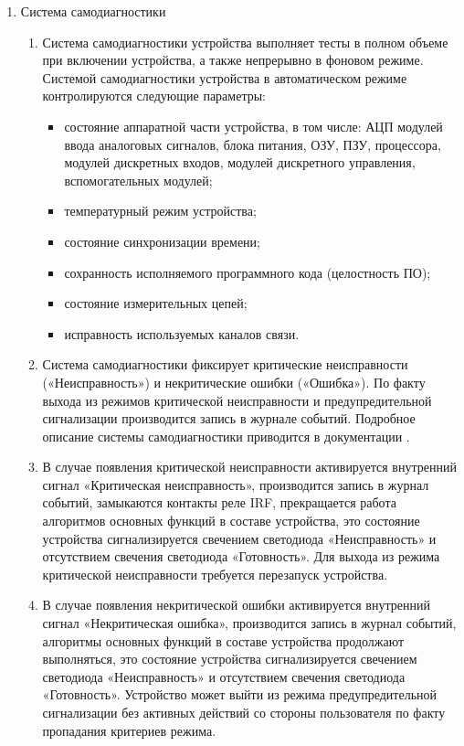 \begin{enumerate}
\item Система самодиагностики
\begin{enumerate}
\item Система самодиагностики устройства выполняет тесты в полном объеме при включении устройства, а также непрерывно в фоновом режиме.
Системой самодиагностики устройства в автоматическом режиме контролируются следующие параметры:
\begin{itemize}
\item состояние аппаратной части устройства, в том числе: АЦП модулей ввода аналоговых сигналов, блока питания, ОЗУ, ПЗУ, процессора, модулей дискретных входов, модулей дискретного управления, вспомогательных модулей;
\item температурный режим устройства;
\item состояние синхронизации времени;
\item сохранность исполняемого программного кода (целостность ПО);
\item состояние измерительных цепей;
\item исправность используемых каналов связи.
\end{itemize}
\item Система самодиагностики фиксирует критические неисправности («Неисправность») и некритические ошибки («Ошибка»).
По факту выхода из режимов критической неисправности и предупредительной сигнализации производится запись в журнале событий.
Подробное описание системы самодиагностики приводится в документации \ManualUnitGeneral.
\item В случае появления критической неисправности активируется внутренний сигнал «Критическая неисправность», производится запись в журнал событий, замыкаются контакты реле IRF, прекращается работа алгоритмов основных функций в составе устройства, это состояние устройства сигнализируется свечением светодиода «Неисправность» и отсутствием свечения светодиода «Готовность».
Для выхода из режима критической неисправности требуется перезапуск устройства.
\item В случае появления некритической ошибки активируется внутренний сигнал «Некритическая ошибка», производится запись в журнал событий, алгоритмы основных функций в составе устройства продолжают выполняться, это состояние устройства сигнализируется свечением светодиода «Неисправность» и отсутствием свечения светодиода «Готовность».
Устройство может выйти из режима предупредительной сигнализации без активных действий со стороны пользователя по факту пропадания критериев режима.
\end{enumerate}


\end{enumerate}
